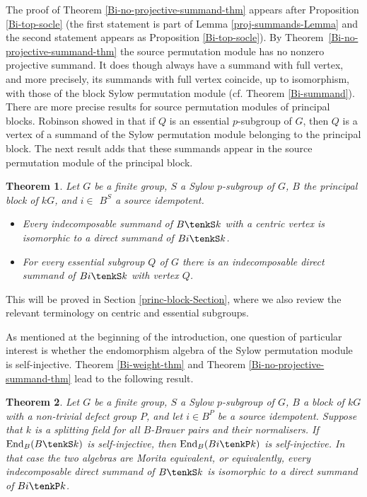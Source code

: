 \documentclass{amsart}
\theoremstyle{plain}\newtheorem{Theorem}{Theorem}[section]
\theoremstyle{plain}\newtheorem{Conjecture}[Theorem]{Conjecture}
\theoremstyle{plain}\newtheorem{Corollary}[Theorem]{Corollary}
\theoremstyle{plain}\newtheorem{Lemma}[Theorem]{Lemma}
\theoremstyle{plain}\newtheorem{Proposition}[Theorem]{Proposition}
\theoremstyle{definition}\newtheorem{Definition}[Theorem]{Definition}
\theoremstyle{definition}\newtheorem{Example}[Theorem]{Example}
\theoremstyle{definition}\newtheorem{Examples}[Theorem]{Examples}
\theoremstyle{definition}\newtheorem{Exercise}[Theorem]{Exercise}
\theoremstyle{definition}\newtheorem{Notation}[Theorem]{Notation}
\theoremstyle{definition}\newtheorem{Remark}[Theorem]{Remark}
\theoremstyle{definition}\newtheorem{Remarks}[Theorem]{Remarks}
\theoremstyle{plain}\newtheorem{Statement}[Theorem]{}
\def\End{\mathrm{End}}
\begin{document}
The proof of  Theorem \ref{Bi-no-projective-summand-thm}   appears after  
Proposition  \ref{Bi-top-socle} (the first statement is part of    
Lemma \ref{proj-summands-Lemma} and the  second  statement   appears 
as  Proposition \ref{Bi-top-socle}).
By Theorem~\ref{Bi-no-projective-summand-thm} the source permutation module 
has no nonzero projective 
summand. It does though always have a summand with full vertex, and more
precisely,  its summands with full vertex coincide,  up to isomorphism,  with those of 
the block Sylow 
permutation  module (cf. Theorem \ref{Bi-summand}).  
There are more precise results for source permutation modules of principal blocks. 
Robinson showed  in \cite[Theorem 1.2]{Rob88} that if $Q$ is an essential 
$p$-subgroup of $G$, then $Q$ is a vertex of a summand
of the Sylow permutation module belonging to the principal block. The next
result adds that these summands appear in the source permutation module
of the principal block.

\begin{Theorem} \label{princ-block-thm}
Let $G$ be  a finite group, $S$ a Sylow $p$-subgroup of $G$, $B$ the
principal block of $kG$, and $i\in $ $B^S$ a source idempotent.
\begin{itemize}
\item[{\rm (i)}]
Every indecomposable summand of $B\tenkS k$ with a centric vertex is 
isomorphic to a direct summand of $Bi\tenkS k$. 
\item[{\rm (ii)}]
For every essential subgroup $Q$ of $G$ there is an indecomposable direct
summand of $Bi\tenkS k$ with vertex $Q$.
\end{itemize}
\end{Theorem}

This will be proved in Section \ref{princ-block-Section}, where we also review the
relevant terminology on centric and essential subgroups.

\medskip
As mentioned   at the beginning of the introduction,  one  question  of particular
interest is  whether the  endomorphism  algebra  of the Sylow permutation 
module   is self-injective.    Theorem \ref{Bi-weight-thm}  and   Theorem 
\ref{Bi-no-projective-summand-thm}   lead  to the following result.

\begin{Theorem} \label{Bi-selfinjective-thm1}
Let $G$ be a finite group,  $S$ a Sylow $p$-subgroup of $G$, 
$B$ a block of $kG$ with a non-trivial defect group $P$, and let $i\in B^P$ 
be a source idempotent.
Suppose that $k$ is a splitting field for all $B$-Brauer pairs and their normalisers.
If $\End_B(B\tenkS k)$ is self-injective, then $\End_B(Bi\tenkP k)$ is self-injective.
In that case  the two algebras are Morita equivalent, or equivalently, every 
indecomposable direct summand of $B\tenkS k$ is isomorphic to a direct 
summand of $Bi\tenkP k$.
\end{Theorem}
\end{document}
